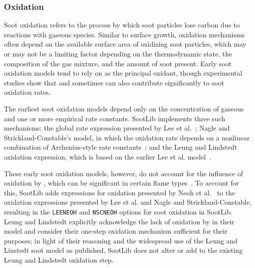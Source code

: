 \documentclass[preprint,letterpaper]{elsarticle}
\begin{document}
\subsubsection{Oxidation}
\label{sss:oxi}

Soot oxidation refers to the process by which soot particles lose carbon due to reactions with gaseous species. Similar to surface growth, oxidation mechanisms often depend on the available surface area of oxidizing soot particles, which may or may not be a limiting factor depending on the thermodynamic state, the composition of the gas mixture, and the amount of soot present. Early soot oxidation models tend to rely on  as the principal oxidant, though experimental studies show that  and sometimes  can also contribute significantly to soot oxidation rates.

The earliest soot oxidation models depend only on the concentration of gaseous  and one or more empirical rate constants. SootLib implements three such mechanisms: the global rate expression presented by Lee et al.~\cite{Lee_1962}; Nagle and Strickland-Constable's model, in which the oxidation rate depends on a nonlinear combination of Arrhenius-style rate constants~\cite{Nagle_1962}; and the Leung and Lindstedt oxidation expression, which is based on the earlier Lee et al. model~\cite{Leung_1991}.

These early soot oxidation models, however, do not account for the influence of oxidation by , which can be significant in certain flame types~\cite{Neoh_1980}. To account for this, SootLib adds expressions for  oxidation presented by Neoh et al.~\cite{Neoh_1981} to the oxidation expressions presented by Lee et al. and Nagle and Strickland-Constable, resulting in the \texttt{LEE\textunderscore NEOH} and \texttt{NSC\textunderscore NEOH} options for soot oxidation in SootLib. Leung and Lindstedt explicitly acknowledge the lack of oxidation by  in their model and consider their one-step oxidation mechanism sufficient for their purposes; in light of their reasoning and the widespread use of the Leung and Linstedt soot model as published, SootLib does not alter or add to the existing Leung and Lindstedt oxidation step.
\end{document}
